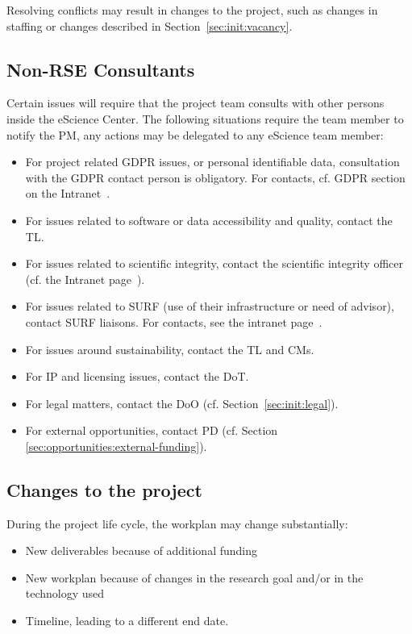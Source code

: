 \documentclass[11pt]{article}
\begin{document}
Resolving conflicts may result in changes to the project, such as changes in staffing or changes described in Section~\ref{sec:init:vacancy}.

\subsection{Non-RSE Consultants}
\label{sec:exec:consult}
Certain issues will require that the project team consults with other persons inside the eScience Center. The following
situations require the team member to notify the PM, any actions may be delegated to any eScience team member:

\begin{itemize}
\item For project related GDPR issues, or personal identifiable data, consultation with the GDPR contact person is
obligatory. For contacts, cf. GDPR section on the Intranet~\cite{proj-intranet}. 
\item For issues related to software or data accessibility and quality, contact the TL.
\item For issues related to scientific integrity, contact the scientific integrity officer (cf. the Intranet page~\cite{proj-intranet}).
\item For issues related to SURF (use of their infrastructure or need of advisor), contact SURF liaisons. For
contacts, see the intranet page~\cite{access-infra}.
\item For issues around sustainability, contact the TL and CMs.
\item For IP and licensing issues, contact the DoT.
\item For legal matters, contact the DoO (cf. Section~\ref{sec:init:legal}).
\item For external opportunities, contact PD (cf. Section \ref{sec:opportunities:external-funding}).
\end{itemize}

\subsection{Changes to the project}
\label{sec:exec:changes}
During the project life cycle, the workplan may change substantially:

\begin{itemize}
\item New deliverables because of additional funding
\item New workplan because of changes in the research goal and/or in the technology used
\item Timeline, leading to a different end date.
\end{itemize}
\end{document}
